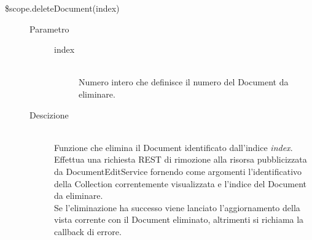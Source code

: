 \begin{description}
\begin{description}
  \item[\$scope.deleteDocument(index)] \hfill 
  \begin{description}
  	\item[Parametro] \hfill
  	\begin{description}
  		\item[index] \hfill \\
  		Numero intero che definisce il numero del Document da eliminare.
  	\end{description}
  	\item[Descizione] \hfill \\
  Funzione che elimina il Document identificato dall'indice \emph{index}. Effettua una richiesta REST di rimozione alla risorsa pubblicizzata da DocumentEditService fornendo come argomenti l'identificativo della Collection correntemente visualizzata e l'indice del Document da eliminare. \\
  Se l'eliminazione ha successo viene lanciato l'aggiornamento della vista corrente con il Document eliminato, altrimenti si richiama la callback di errore.
  \end{description}
  
 \end{description}
\end{description}

